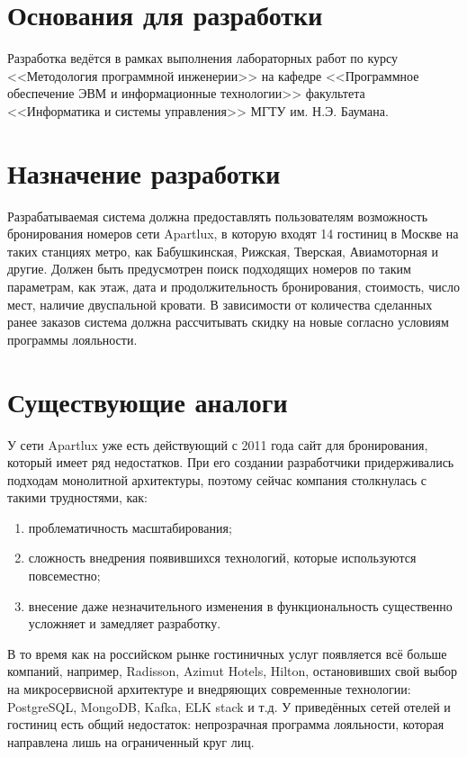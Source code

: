 
\section*{Основания для разработки}
Разработка ведётся в рамках выполнения лабораторных работ по курсу <<Методология программной инженерии>> на кафедре <<Программное обеспечение ЭВМ и информационные технологии>> факультета <<Информатика и системы управления>> МГТУ им. Н.Э. Баумана.

\section*{Назначение разработки}
Разрабатываемая система должна предоставлять пользователям возможность бронирования номеров сети Apartlux, в которую входят 14 гостиниц в Москве на таких станциях метро, как Бабушкинская, Рижская, Тверская, Авиамоторная и другие. Должен быть предусмотрен поиск подходящих номеров по таким параметрам, как этаж, дата и продолжительность бронирования, стоимость, число мест, наличие двуспальной кровати. В зависимости от количества сделанных ранее заказов система должна рассчитывать скидку на новые согласно условиям программы лояльности.

\section*{Существующие аналоги}
У сети Apartlux уже есть действующий с 2011 года сайт для бронирования, который имеет ряд недостатков. При его создании разработчики придерживались подходам монолитной архитектуры, поэтому сейчас компания столкнулась с такими трудностями, как:
\begin{enumerate}
	\item проблематичность масштабирования;
	
	\item сложность внедрения появившихся технологий, которые используются повсеместно;
	
	\item внесение даже незначительного изменения в функциональность существенно усложняет и замедляет разработку.
\end{enumerate}

В то время как на российском рынке гостиничных услуг появляется всё больше компаний, например, Radisson, Azimut Hotels, Hilton, остановивших свой выбор на микросервисной архитектуре и внедряющих современные технологии: PostgreSQL, MongoDB, Kafka, ELK stack и т.д. У приведённых сетей отелей и гостиниц есть общий недостаток: непрозрачная программа лояльности, которая направлена лишь на ограниченный круг лиц.


